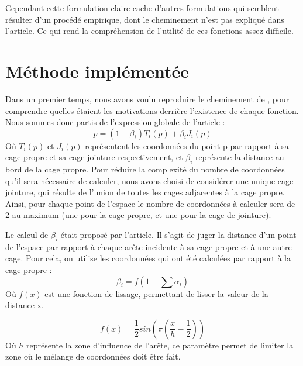 Cependant cette formulation claire cache d'autres formulations qui
semblent résulter d'un procédé empirique, dont le cheminement n'est
pas expliqué dans l'article. Ce qui rend la compréhension de l'utilité
de ces fonctions assez difficile.

\section{Méthode implémentée}
Dans un premier temps, nous avons voulu reproduire le cheminement de
\cite{GPCP13}, pour comprendre quelles étaient les motivations
derrière l'existence de chaque fonction. Nous sommes donc partis de
l'expression globale de l'article :
\begin{equation}
  p = (1 - \beta_i) T_i(p)  + \beta_i J_i(p) 
\end{equation}
Où $T_i(p)$ et $J_i(p)$ représentent les coordonnées du point p par
rapport à sa cage propre et sa cage jointure respectivement, et
$\beta_i$ représente la distance au bord de la cage propre. Pour
réduire la complexité du nombre de coordonnées qu'il sera nécessaire
de calculer, nous avons choisi de considérer une unique cage jointure,
qui résulte de l'union de toutes les cages adjacentes à la cage
propre. Ainsi, pour chaque point de l'espace le nombre de coordonnées
à calculer sera de 2 au maximum (une pour la cage propre, et une pour
la cage de jointure).

Le calcul de $\beta_i$ était proposé par l'article. Il s'agit de juger
la distance d'un point de l'espace par rapport à chaque arête
incidente à sa cage propre et à une autre cage. Pour cela, on utilise
les coordonnées qui ont été calculées par rapport à la cage propre :
\begin{equation}
  \beta_{i} = f(1 - \sum \alpha_i)
\end{equation}
Où $f(x)$ est une fonction de lissage, permettant de lisser la valeur
de la distance x.

\begin{equation}
  f(x) = \frac{1}{2} sin(\pi(\frac{x}{h}-\frac{1}{2}))
\end{equation}
Où $h$ représente la zone d'influence de l'arête, ce paramètre permet
de limiter la zone où le mélange de coordonnées doit être fait.


